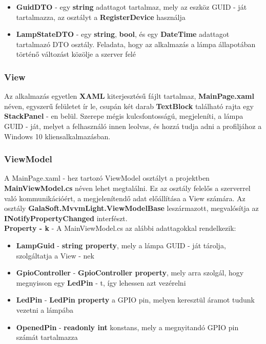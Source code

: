 \documentclass[a4paper,12pt]{report}
\begin{document}
    \begin{itemize}
        \item \textbf{GuidDTO} - egy \textbf{string} adattagot tartalmaz, mely az eszköz GUID - ját tartalmazza, az osztályt
        a \textbf{RegisterDevice} használja
        \item \textbf{LampStateDTO} - egy \textbf{string}, \textbf{bool}, és egy \textbf{DateTime} adattagot tartalmazó DTO
        osztály. Feladata, hogy az alkalmazás a lámpa állapotában történő változást közölje a szerver felé
    \end{itemize}

    \subsubsection{View}
    Az alkalmazás egyetlen \textbf{XAML} kiterjesztésű fájlt tartalmaz, \textbf{MainPage.xaml} néven, egyszerű felületet
    ír le, csupán két darab \textbf{TextBlock} található rajta egy \textbf{StackPanel} - en belül. Szerepe mégis kulcsfontosságú,
    megjeleníti, a lámpa GUID - ját, melyet a felhasználó innen leolvas, és hozzá tudja adni a profiljához a Windows 10 kliensalkalmazásban.

    \subsubsection{ViewModel}
    A MainPage.xaml - hez tartozó ViewModel osztályt a projektben \textbf{MainViewModel.cs} néven lehet megtalálni. Ez az osztály
    felelős a szerverrel való kommunikációért, a megjelenítendő adat előállítása a View számára. Az osztály \textbf{GalaSoft.MvvmLight.ViewModelBase}
    leszármazott, megvalósítja az \textbf{INotifyPropertyChanged} interfészt.\\

    \textbf{Property - k} - A MainViewModel.cs az alábbi adattagokkal rendelkezik:

    \begin{itemize}
        \item \textbf{LampGuid} - \textbf{string property}, mely a lámpa GUID - ját tárolja, szolgáltatja a View - nek
        \item \textbf{GpioController} - \textbf{GpioController property}, mely arra szolgál, hogy megnyisson egy \textbf{LedPin} - t, így
        lehessen azt vezérelni
        \item \textbf{LedPin} - \textbf{LedPin property} a GPIO pin, melyen keresztül áramot tudunk vezetni a lámpába
        \item \textbf{OpenedPin} - \textbf{readonly int} konstans, mely a megnyitandó GPIO pin számát tartalmazza
    \end{itemize}
\end{document}
